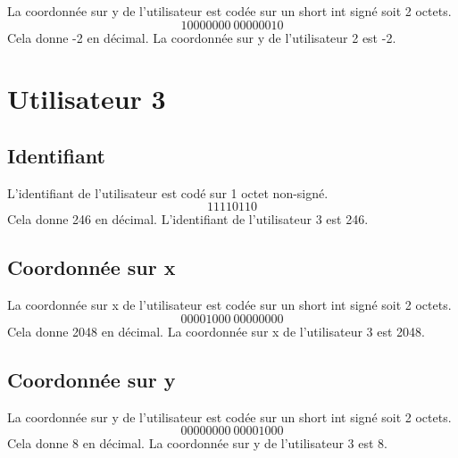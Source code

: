 \documentclass{article}
\begin{document}
La coordonnée sur y de l'utilisateur est codée sur un short int signé soit 2 octets.
\[10000000 \ 00000010\]
Cela donne -2 en décimal. La coordonnée sur y de l'utilisateur 2 est -2.

\section{Utilisateur 3}

\subsection{Identifiant}

L'identifiant de l'utilisateur est codé sur 1 octet non-signé.
\[11110110\]
Cela donne 246 en décimal. L'identifiant de l'utilisateur 3 est 246.

\subsection{Coordonnée sur x}

La coordonnée sur x de l'utilisateur est codée sur un short int signé soit 2 octets.
\[00001000 \ 00000000\]
Cela donne 2048 en décimal. La coordonnée sur x de l'utilisateur 3 est 2048.

\subsection{Coordonnée sur y}

La coordonnée sur y de l'utilisateur est codée sur un short int signé soit 2 octets.
\[00000000 \ 00001000\]
Cela donne 8 en décimal. La coordonnée sur y de l'utilisateur 3 est 8.
\end{document}
